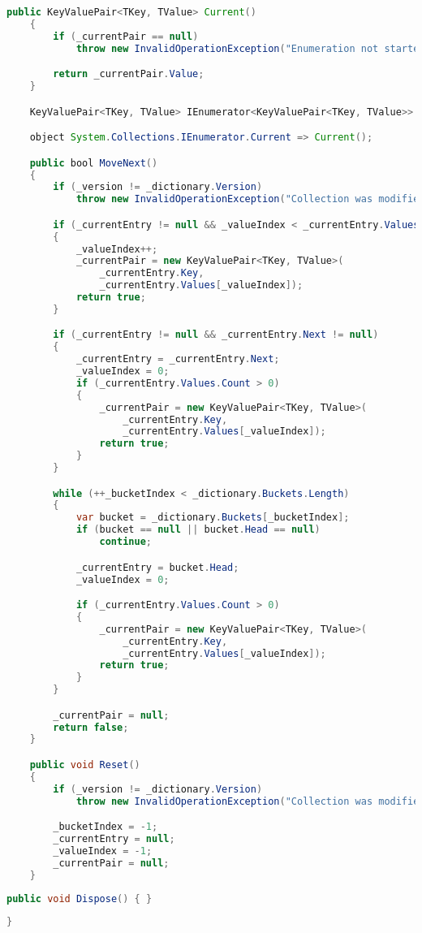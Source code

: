 \documentclass[12pt]{article}
\begin{document}
\begin{lstlisting}[language=Java]
    public KeyValuePair<TKey, TValue> Current()
    {
        if (_currentPair == null)
            throw new InvalidOperationException("Enumeration not started or has ended.");

        return _currentPair.Value;
    }

    KeyValuePair<TKey, TValue> IEnumerator<KeyValuePair<TKey, TValue>>.Current => Current();

    object System.Collections.IEnumerator.Current => Current();

    public bool MoveNext()
    {
        if (_version != _dictionary.Version)
            throw new InvalidOperationException("Collection was modified during iteration");

        if (_currentEntry != null && _valueIndex < _currentEntry.Values.Count - 1)
        {
            _valueIndex++;
            _currentPair = new KeyValuePair<TKey, TValue>(
                _currentEntry.Key,
                _currentEntry.Values[_valueIndex]);
            return true;
        }

        if (_currentEntry != null && _currentEntry.Next != null)
        {
            _currentEntry = _currentEntry.Next;
            _valueIndex = 0;
            if (_currentEntry.Values.Count > 0)
            {
                _currentPair = new KeyValuePair<TKey, TValue>(
                    _currentEntry.Key,
                    _currentEntry.Values[_valueIndex]);
                return true;
            }
        }

        while (++_bucketIndex < _dictionary.Buckets.Length)
        {
            var bucket = _dictionary.Buckets[_bucketIndex];
            if (bucket == null || bucket.Head == null)
                continue;

            _currentEntry = bucket.Head;
            _valueIndex = 0;

            if (_currentEntry.Values.Count > 0)
            {
                _currentPair = new KeyValuePair<TKey, TValue>(
                    _currentEntry.Key,
                    _currentEntry.Values[_valueIndex]);
                return true;
            }
        }

        _currentPair = null;
        return false;
    }

    public void Reset()
    {
        if (_version != _dictionary.Version)
            throw new InvalidOperationException("Collection was modified during iteration");

        _bucketIndex = -1;
        _currentEntry = null;
        _valueIndex = -1;
        _currentPair = null;
    }

\end{lstlisting}

\begin{lstlisting}[language=Java]
    public void Dispose() { }
\end{lstlisting}

\begin{lstlisting}[language=Java]
}


\end{lstlisting}
\end{document}
